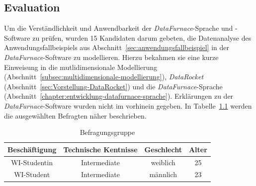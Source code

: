 \documentclass[
  language=german, %
  type=bachelor%
]{isthesis}
\begin{document}
\begin{content}

%  


\chapter{Evaluation}

Um die Verständlichkeit und Anwendbarkeit der \textit{DataFurnace}-Sprache und
-Software zu prüfen, wurden 15 Kandidaten darum gebeten, die Datenanalyse des
Anwendungsfallbeispiels aus Abschnitt~\ref{sec:anwendungsfallbeispiel} in der
\textit{DataFurnace}-Software zu modellieren. Hierzu bekahmen sie eine kurze
Einweisung in die mutlidimensionale Modellierung
(Abschnitt~\ref{subsec:multidimensionale-modellierung}), \textit{DataRocket}
(Abschnitt~\ref{sec:Vorstellung-DataRocket}) und die
\textit{DataFurnace}-Sprache
(Abschnitt~\ref{chapter:entwicklung-datafurnace-sprache}). Erklärungen zu der
\textit{DataFurnace}-Software wurden nicht im vorhinein gegeben.  In
Tabelle~\ref{table:befragungsgruppe} werden die ausgewählten Befragten näher
beschrieben.

  \begin{table}[]
    \footnotesize
    \begin{tabular}{c c c c}
      Beschäftigung & Technische Kentnisse & Geschlecht & Alter \\
      \toprule
      WI-Studentin & Intermediate & weiblich & 25 \\
      WI-Student & Intermediate & männlich & 23 \\
    \end{tabular}
    \caption{Befragungsgruppe}\label{table:befragungsgruppe}
  \end{table}


\end{content}
\end{document}
